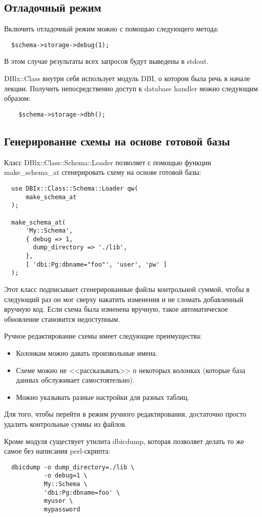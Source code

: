 \subsection{Отладочный режим}
Включить отладочный режим можно с помощью следующего метода:
\begin{verbatim}
  $schema->storage->debug(1);
\end{verbatim}
В этом случае результаты всех запросов будут выведены в stdout.

DBlx::Class внутри себя использует модуль DBI, о котором была речь в начале лекции. Получить непосредственно доступ к database handler можно следующим образом:
\begin{verbatim}
    $schema->storage->dbh();
\end{verbatim}

\subsection{Генерирование схемы на основе готовой базы} %
Класс DBlx::Class::Schema::Loader позволяет с помощью функции make\_schema\_at сгенерировать схему на основе готовой базы:
\begin{verbatim}
  use DBIx::Class::Schema::Loader qw(
      make_schema_at
  );

  make_schema_at(
      'My::Schema',
      { debug => 1,
        dump_directory => './lib',
      },
      [ 'dbi:Pg:dbname="foo"', 'user', 'pw' ]
  );
\end{verbatim}
Этот класс подписывает сгенерированные файлы контрольной суммой, чтобы в следующий раз он мог сверху накатить изменения и не сломать добавленный вручную код. Если схема была изменена вручную, такое автоматическое обновление становится недоступным.

Ручное редактирование схемы имеет следующие преимущества:
\begin{itemize}
  \item Колонкам можно давать произвольные имена.
  \item Схеме можно не <<рассказывать>> о некоторых колонках (которые база данных обслуживает самостоятельно).
  \item Можно указывать разные настройки для разных таблиц.
\end{itemize}
Для того, чтобы перейти в режим ручного редактирования, достаточно просто удалить контрольные суммы из файлов.

Кроме модуля существует утилита dbicdump, которая позволяет делать то же самое без написания perl-скрипта:
\begin{verbatim}
  dbicdump -o dump_directory=./lib \
           -o debug=1 \
           My::Schema \
           'dbi:Pg:dbname=foo' \
           myuser \
           mypassword
\end{verbatim}

